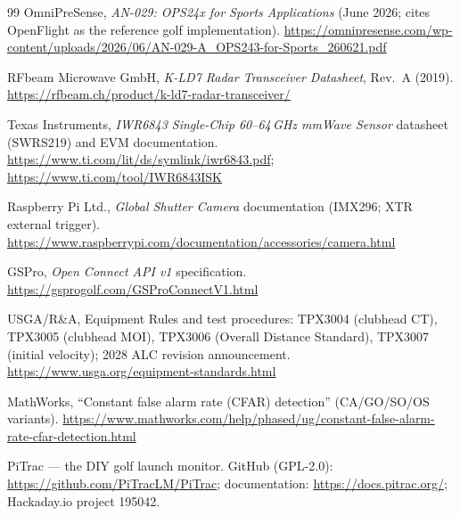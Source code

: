 \begin{thebibliography}{99}
OmniPreSense, \emph{AN-029: OPS24x for Sports Applications} (June 2026;
cites OpenFlight as the reference golf implementation).
\url{https://omnipresense.com/wp-content/uploads/2026/06/AN-029-A_OPS243-for-Sports_260621.pdf}

RFbeam Microwave GmbH, \emph{K-LD7 Radar Transceiver Datasheet}, Rev.\ A
(2019). \url{https://rfbeam.ch/product/k-ld7-radar-transceiver/}

Texas Instruments, \emph{IWR6843 Single-Chip 60--64\,GHz mmWave Sensor}
datasheet (SWRS219) and EVM documentation.
\url{https://www.ti.com/lit/ds/symlink/iwr6843.pdf};
\url{https://www.ti.com/tool/IWR6843ISK}

Raspberry Pi Ltd., \emph{Global Shutter Camera} documentation (IMX296;
XTR external trigger).
\url{https://www.raspberrypi.com/documentation/accessories/camera.html}

GSPro, \emph{Open Connect API v1} specification.
\url{https://gsprogolf.com/GSProConnectV1.html}

USGA/R\&A, Equipment Rules and test procedures: TPX3004 (clubhead CT),
TPX3005 (clubhead MOI), TPX3006 (Overall Distance Standard), TPX3007
(initial velocity); 2028 ALC revision announcement.
\url{https://www.usga.org/equipment-standards.html}

MathWorks, ``Constant false alarm rate (CFAR) detection'' (CA/GO/SO/OS
variants).
\url{https://www.mathworks.com/help/phased/ug/constant-false-alarm-rate-cfar-detection.html}

PiTrac --- the DIY golf launch monitor. GitHub (GPL-2.0):
\url{https://github.com/PiTracLM/PiTrac}; documentation:
\url{https://docs.pitrac.org/}; Hackaday.io project 195042.

\end{thebibliography}

